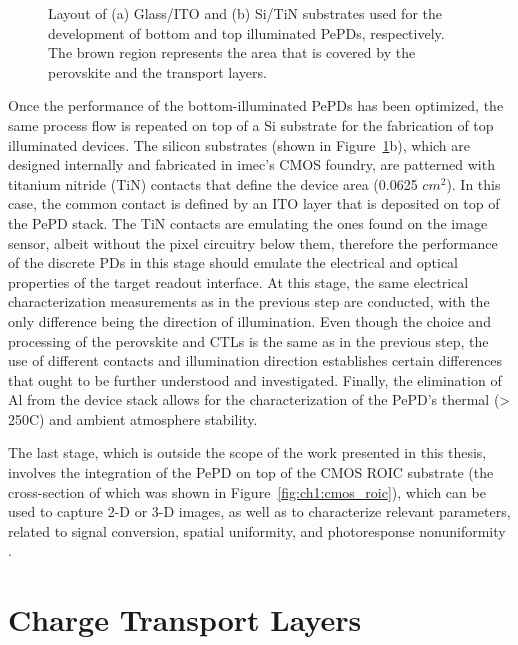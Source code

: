 \begin{figure}[htbp]
    \caption[Substrate schematics for the development of bottom and top illuminated PePDs.]{Layout of (a) Glass/ITO and (b) Si/TiN substrates used for the development of bottom and top illuminated PePDs, respectively. The brown region represents the area that is covered by the perovskite and the transport layers.}
    \label{fig:ch2:types_of_substrates}
\end{figure}


Once the performance of the bottom-illuminated PePDs has been optimized, the same process flow is repeated on top of a Si substrate for the fabrication of top illuminated devices. The silicon substrates (shown in Figure~\ref{fig:ch2:types_of_substrates}b), which are designed internally and fabricated in imec's CMOS foundry, are patterned with titanium nitride (TiN) contacts that define the device area (0.0625 $cm^2$). In this case, the common contact is defined by an ITO layer that is deposited on top of the PePD stack. The TiN contacts are emulating the ones found on the image sensor, albeit without the pixel circuitry below them, therefore the performance of the discrete PDs in this stage should emulate the electrical and optical properties of the target readout interface. At this stage, the same electrical characterization measurements as in the previous step are conducted, with the only difference being the direction of illumination. Even though the choice and processing of the perovskite and CTLs is the same as in the previous step, the use of different contacts and illumination direction establishes certain differences that ought to be further understood and investigated. Finally, the elimination of Al from the device stack allows for the characterization of the PePD's thermal (> 250\degree C) and ambient atmosphere stability. 

The last stage, which is outside the scope of the work presented in this thesis, involves the integration of the PePD on top of the CMOS ROIC substrate (the cross-section of which was shown in Figure~\ref{fig:ch1:cmos_roic}), which can be used to capture 2-D or 3-D images, as well as to characterize relevant parameters, related to signal conversion, spatial uniformity, and photoresponse nonuniformity \cite{Malinowski2023ImageAbsorbers, Song2024HalideImager}. 



\section{Charge Transport Layers}

